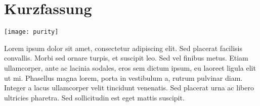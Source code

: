 \chapter{Kurzfassung}

\par
\texttt{[image: purity]}

\par
Lorem ipsum dolor sit amet, consectetur adipiscing elit. Sed placerat facilisis convallis. Morbi sed ornare turpis, et suscipit leo. Sed vel finibus metus. Etiam ullamcorper, ante ac lacinia sodales, eros sem dictum ipsum, eu laoreet ligula elit ut mi. Phasellus magna lorem, porta in vestibulum a, rutrum pulvinar diam. Integer a lacus ullamcorper velit tincidunt venenatis. Sed placerat urna ac libero ultricies pharetra. Sed sollicitudin est eget mattis suscipit.\\

\par






